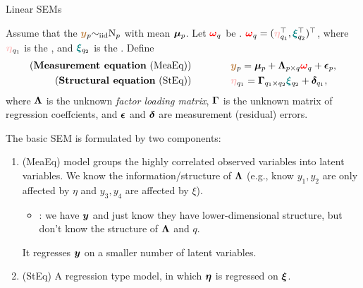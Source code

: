 \documentclass[10pt,a4paper]{book}
\begin{document}
\begin{defbox}{Linear SEMs}
	\begin{definition}\label{def:linearSEM}
		Assume that the  $\textcolor{brown}{{\boldsymbol y}}_p{\sim}_{\mathrm{iid}} \mathrm{N}_p$ with mean ${\boldsymbol\mu}_p$. Let $\textcolor{red}{{\boldsymbol\omega}}_q$ be . $\red{\bao}_q = (\pink{\bet}_{q_1}^\TT,\teal{\bax}_{q_2}^\TT)^\TT$, where $\pink{\bet}_{q_1}$ is the , and $\textcolor{teal}{{\boldsymbol\xi}}_{q_2}$ is the . Define 
		\begin{equation}\label{eq:linearSEM}
			\begin{aligned}
			\text{(\textbf{Measurement equation} (MeaEq))}\qquad\qquad & \brown{\y}_p = \bam_p + \baL_{p\times q} \red{\bao}_q + \bae_p, \\
			\text{(\textbf{Structural equation} (StEq))}\qquad\qquad &
			\pink{\bet}_{q_1} = \baG_{q_1\times q_2} \teal{\bax}_{q_2} + \bad_{q_1},
			\end{aligned}
		\end{equation}
		where ${\boldsymbol\Lambda}$ is the unknown \textit{factor loading matrix}, ${\boldsymbol\Gamma}$ is the unknown matrix of regression
		coeffcients, and ${\boldsymbol\epsilon}$ and ${\boldsymbol\delta}$ are measurement (residual) errors.   
	\end{definition}
\end{defbox}
The basic SEM is formulated by two components:
\begin{enumerate}
	\item (MeaEq)  model groups the highly correlated observed variables into latent variables. 
	We know the information/structure of ${\boldsymbol\Lambda}$ (e.g., know $y_1,y_2$ are only affected by $\eta$ and $y_3,y_4$ are affected by $\xi$). 
	\begin{itemize}
		\item {}: we have ${\boldsymbol y}$ and just know they have lower-dimensional structure, but don't know the structure of ${\boldsymbol\Lambda}$ and $q$.   
	\end{itemize}
	It regresses ${\boldsymbol y}$ on a smaller number of latent variables. 
	\item (StEq) A regression type model, in which ${\boldsymbol\eta}$ is regressed on ${\boldsymbol\xi}$. 
\end{enumerate}
\end{document}
